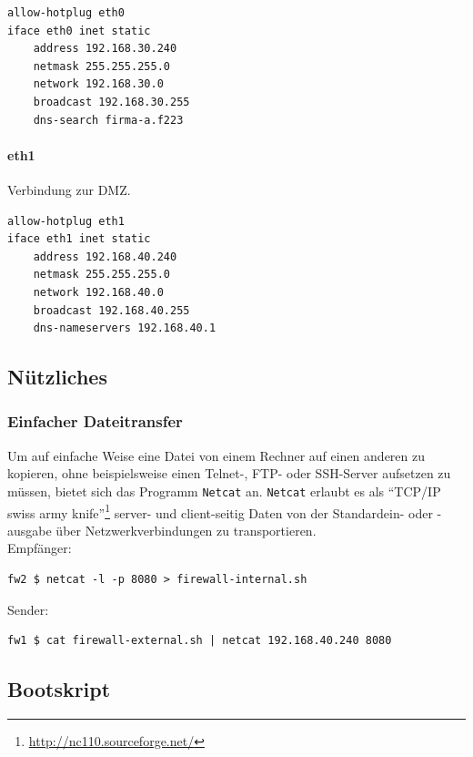 \begin{lstlisting}[label=lst:fw2:eth0,caption={Netzwerkadapter eth0 Konfiguration.}]
allow-hotplug eth0
iface eth0 inet static
    address 192.168.30.240
    netmask 255.255.255.0
    network 192.168.30.0
    broadcast 192.168.30.255
    dns-search firma-a.f223
\end{lstlisting}

\paragraph{eth1} Verbindung zur DMZ.

\begin{lstlisting}[label=lst:fw2:eth1,caption={Netzwerkadapter eth1 Konfiguration.}]
allow-hotplug eth1
iface eth1 inet static
    address 192.168.40.240
    netmask 255.255.255.0
    network 192.168.40.0
    broadcast 192.168.40.255
    dns-nameservers 192.168.40.1
\end{lstlisting}


\subsection{Nützliches}

\subsubsection{Einfacher Dateitransfer}

Um auf einfache Weise eine Datei von einem Rechner auf einen anderen zu
kopieren, ohne beispielsweise einen Telnet-, FTP- oder SSH-Server aufsetzen zu
müssen, bietet sich das Programm {\tt Netcat} an.
{\tt Netcat} erlaubt es als "`TCP/IP swiss army knife"'\footnote{
\url{http://nc110.sourceforge.net/}
} server- und client-seitig Daten von der Standardein- oder -ausgabe über
Netzwerkverbindungen zu transportieren.\\

\noindent Empfänger:
\begin{verbatim}
fw2 $ netcat -l -p 8080 > firewall-internal.sh
\end{verbatim}

\noindent Sender:
\begin{verbatim}
fw1 $ cat firewall-external.sh | netcat 192.168.40.240 8080
\end{verbatim}


\subsection{Bootskript}

